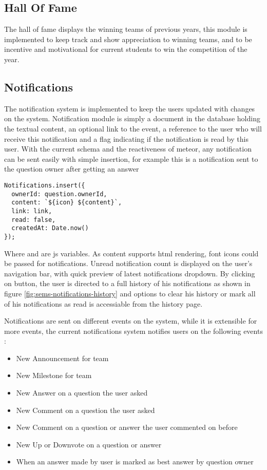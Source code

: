 \subsection{Hall Of Fame}
\label{sub:hall-of-fame}
The hall of fame displays the winning teams of previous years, this module is implemented to keep track and show appreciation to winning
teams, and to be incentive and motivational for current students to win the competition of the year.

\subsection{Notifications}
\label{sub:notifications}
The notification system is implemented to keep the users updated with changes on the system. Notification module is
simply a document in the database holding the textual content, an optional link to the event, a reference to the user who will receive this
notification and a flag indicating if the notification is read by this user. With the current schema and the reactiveness of meteor,
any notification can be sent easily with simple insertion, for example this is a notification sent to the question owner
after getting an answer
\vspace{15cm}
\begin{verbatim}
Notifications.insert({
  ownerId: question.ownerId,
  content: `${icon} ${content}`,
  link: link,
  read: false,
  createdAt: Date.now()
});
\end{verbatim}

\newParagraph
Where  and  are \ac{js} variables. As content supports html rendering, font icons could be passed
for notifications. Unread notification count is displayed on the user's navigation bar, with quick preview of latest notifications dropdown.
By clicking on  button, the user is directed to a full history of his notifications as shown in figure \ref{fig:sems-notifications-history}
and options to clear his history or mark all of his notifications as read is accessiable from the history page.

\newParagraph
Notifications are sent on different events on the system, while it is extensible for more events, the current notifications system notifies
users on the following events :
\begin{itemize}
  \item New Announcement for team
  \item New Milestone for team
  \item New Answer on a question the user asked
  \item New Comment on a question the user asked
  \item New Comment on a question or answer the user commented on before
  \item New Up or Downvote on a question or answer
  \item When an answer made by user is marked as best answer by question owner
\end{itemize}

